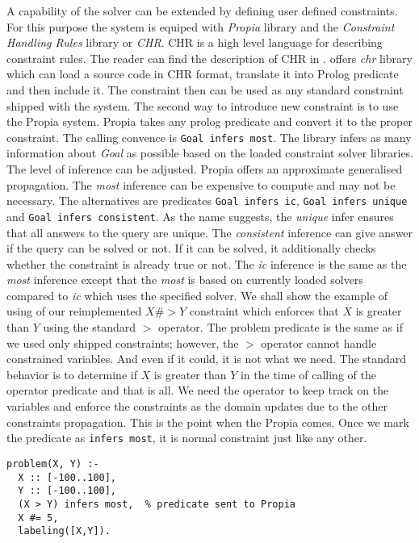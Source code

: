 A capability of the solver can be extended by defining user defined constraints. For this
purpose the system is equiped with {\em Propia} library and the {\em Constraint Handling Rules}
library or {\em CHR}. CHR is a high level language for describing constraint rules. The reader can find
the description of CHR in \cite{fru_chr_book_2009}.
\eclipse offers {\em chr} library which can load a source code in CHR format, translate it
into Prolog predicate and then include it. The constraint then can be used as any standard
constraint shipped with the system.
The second way to introduce new constraint is to use the Propia system. Propia takes 
any prolog predicate and convert it to the proper constraint.
The calling convence is \texttt{Goal infers most}. The library infers as many information about {\em Goal} 
as possible based on the loaded constraint solver libraries. The level of inference can be adjusted.
Propia offers an approximate generalised propagation. The {\em most} inference can be expensive 
to compute and may not be necessary. The alternatives are predicates \texttt{Goal infers ic}, 
\texttt{Goal infers unique} and \texttt{Goal infers consistent}. As the name suggests, the {\em unique} 
infer ensures that all answers to the query are unique. The {\em consistent} inference can give
answer if the query can be solved or not. If it can be solved, it additionally checks whether the
constraint is already true or not. The {\em ic} inference is the same as the {\em most} inference except that
the {\em most} is based on currently loaded solvers compared to {\em ic} which uses the specified solver.
We shall show the example of using of our reimplemented $X \#> Y$ constraint which 
enforces that $X$ is greater than $Y$ using the standard $>$ operator. The problem predicate is the same 
as if we used only shipped constraints; however, the $>$ operator cannot handle constrained
variables. And even if it could, it is not what we need. The standard behavior is to 
determine if $X$ is greater than $Y$ in the time of calling of the operator predicate and
that is all. We need the operator to keep track on the variables and enforce the constraints
as the domain updates due to the other constraints propagation. This is the point when the Propia
comes. Once we mark the predicate as \texttt{infers most}, it is normal
constraint just like any other.

\begin{verbatim}
problem(X, Y) :-
  X :: [-100..100], 
  Y :: [-100..100], 
  (X > Y) infers most,  % predicate sent to Propia   
  X #= 5, 
  labeling([X,Y]).
\end{verbatim}

